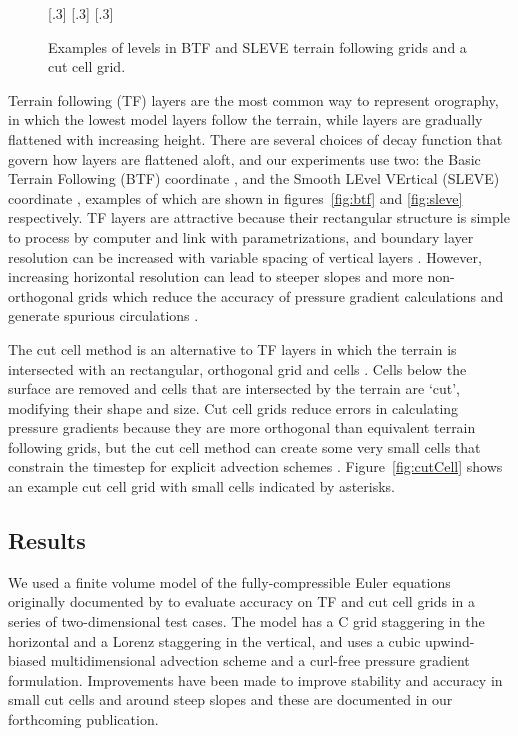 \documentclass[a4paper]{article}
\begin{document}
\begin{figure}
	\centering
	[.3\linewidth]{}
	[.3\linewidth]{}
	[.3\linewidth]{}
%
	\caption{Examples of levels in BTF and SLEVE terrain following grids and a cut cell grid.}
	\label{fig:grids}
\end{figure}

Terrain following (TF) layers are the most common way to represent orography, in which the lowest model layers follow the terrain, while layers are gradually flattened with increasing height.  There are several choices of decay function that govern how layers are flattened aloft, and our experiments use two: the Basic Terrain Following (BTF) coordinate \citep{galchen-somerville1975}, and the Smooth LEvel VErtical (SLEVE) coordinate \citep{schaer2002}, examples of which are shown in figures~\ref{fig:btf} and \ref{fig:sleve} respectively.  TF layers are attractive because their rectangular structure is simple to process by computer and link with parametrizations, and boundary layer resolution can be increased with variable spacing of vertical layers \citep{schaer2002}.
However, increasing horizontal resolution can lead to steeper slopes and more non-orthogonal grids which reduce the accuracy of pressure gradient calculations and generate spurious circulations \citep{dempsey-davis1998,klemp2011}.

The cut cell method is an alternative to TF layers in which the terrain is intersected with an rectangular, orthogonal grid and cells \citep{adcroft1997}.  Cells below the surface are removed and cells that are intersected by the terrain are `cut', modifying their shape and size.  Cut cell grids reduce errors in calculating pressure gradients because they are more orthogonal than equivalent terrain following grids, but the cut cell method can create some very small cells that constrain the timestep for explicit advection schemes \citep{klein2009}.  Figure~\ref{fig:cutCell} shows an example cut cell grid with small cells indicated by asterisks.

\subsection{Results}
We used a finite volume model of the fully-compressible Euler equations originally documented by \citet{weller-shahrokhi2014} to evaluate accuracy on TF and cut cell grids in a series of two-dimensional test cases.  The model has a C grid staggering in the horizontal and a Lorenz staggering in the vertical, and uses a cubic upwind-biased multidimensional advection scheme and a curl-free pressure gradient formulation.  Improvements have been made to improve stability and accuracy in small cut cells and around steep slopes and these are documented in our forthcoming publication.
\end{document}
